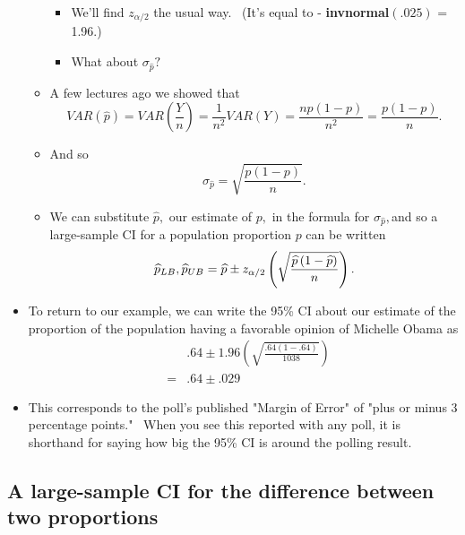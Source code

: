 \documentclass[11pt]{article}
\begin{document}
\begin{itemize}
\begin{itemize}
\begin{itemize}
\item We'll find $z_{\alpha /2}$ the usual way. \ (It's equal to - \textbf{%
invnormal}$\left( .025\right) $ = 1.96.)

\item What about $\sigma _{\widehat{p}}?$
\end{itemize}

\item A few lectures ago we showed that%
\begin{equation*}
VAR\left( \widehat{p}\right) =VAR\left( \frac{Y}{n}\right) =\frac{1}{n^{2}}%
VAR\left( Y\right) =\frac{np\left( 1-p\right) }{n^{2}}=\frac{p\left(
1-p\right) }{n}.
\end{equation*}

\item And so%
\begin{equation*}
\sigma _{\widehat{p}}=\sqrt{\frac{p\left( 1-p\right) }{n}}.
\end{equation*}

\item We can substitute $\widehat{p},$ our estimate of $p,$ in the formula
for $\sigma _{\widehat{p}},$and so a large-sample CI for a population
proportion $p$ can be written%
\begin{equation*}
\widehat{p}_{LB},\widehat{p}_{UB}=\widehat{p}\pm z_{\alpha /2}\left( \sqrt{%
\frac{\widehat{p}\left( 1-\widehat{p}\right) }{n}}\right) .
\end{equation*}
\end{itemize}

\item To return to our example, we can write the 95\% CI about our estimate
of the proportion of the population having a favorable opinion of Michelle
Obama as 
\begin{eqnarray*}
&&.64\pm 1.96\left( \sqrt{\frac{.64\left( 1-.64\right) }{1038}}\right) \\
&=&.64\pm .029
\end{eqnarray*}

\item This corresponds to the poll's published "Margin of Error" of "plus or
minus 3 percentage points." \ When you see this reported with any poll, it
is shorthand for saying how big the 95\% CI is around the polling result.
\end{itemize}

\subsection{A large-sample CI for the difference between two proportions}
\end{document}
